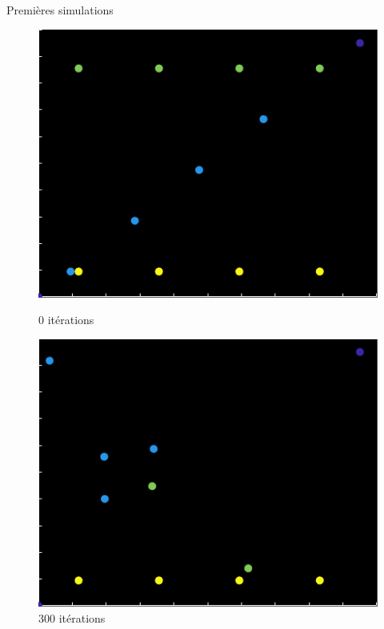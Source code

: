 \documentclass[final,hyperref={pdfpagelabels=false}]{beamer}
\begin{document}
\begin{frame}[t]
\begin{columns}[t]
\begin{column}{.465\textwidth}
\begin{block}{Premi\`eres simulations}
\begin{figure}[h!]
   \begin{minipage}[b]{0.50\linewidth}
      \centering \includegraphics[scale=1.4]{simu_0.png}
      \caption{\text{ }$0$ it\'erations}
   \end{minipage}\hfill
   \begin{minipage}[b]{0.50\linewidth}   
      \centering \includegraphics[scale=1.4]{simu_300.png}
      \caption{\text{ } $300$ it\'erations}
   \end{minipage}
   \begin{minipage}[b]{0.50\linewidth}

\end{minipage}
\end{figure}
\end{block}
\end{column}
\end{columns}
\end{frame}
\end{document}
